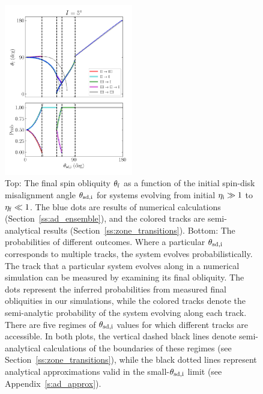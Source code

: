 \documentclass[
        fleqn,
        usenatbib,
    ]{mnras}
\begin{document}
\begin{figure}
    \centering
    \includegraphics[width=0.5\textwidth]{plots_diskdisp/3_ensemble_05_35.png}
    \caption{Top: The final spin obliquity $\theta_{\rm f}$ as a function of the
    initial spin-disk misalignment angle $\theta_{\rm sd, i}$ for systems
    evolving from initial $\eta_{\rm i} \gg 1$ to $\eta_{\rm f} \ll 1$. The blue
    dots are results of numerical calculations (Section~\ref{ss:ad_ensemble}),
    and the colored tracks are semi-analytical results
    (Section~\ref{ss:zone_transitions}). Bottom: The probabilities of different
    outcomes. Where a particular $\theta_{\rm sd, i}$ corresponds to multiple
    tracks, the system evolves probabilistically. The track that a particular
    system evolves along in a numerical simulation can be measured by examining
    its final obliquity. The dots represent the inferred probabilities from
    measured final obliquities in our simulations, while the colored tracks
    denote the semi-analytic probability of the system evolving along each
    track. There are five regimes of $\theta_{\rm sd, i}$ values for which
    different tracks are accessible. In both plots, the vertical dashed black
    lines denote semi-analytical calculations of the boundaries of these regimes
    (see Section~\ref{ss:zone_transitions}), while the black dotted lines
    represent analytical approximations valid in the small-$\theta_{\rm sd, i}$
    limit (see Appendix~\ref{s:ad_approx}).}\label{fig:ad_ensemble}
\end{figure}
\end{document}
